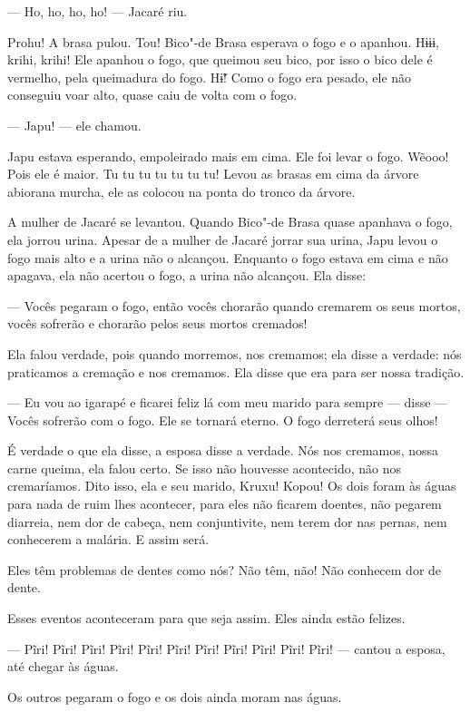 --- Ho, ho, ho, ho! --- Jacaré riu. 

Prohu! A brasa pulou. Tou! Bico"-de Brasa esperava o fogo e
o apanhou. Hɨɨɨ, krihi, krihi! Ele apanhou o fogo, que queimou seu
bico, por isso o bico dele é vermelho, pela queimadura do
fogo. Hɨ̃! Como o fogo era pesado, ele não conseguiu voar alto,
quase caiu de volta com o fogo. 

--- Japu! --- ele chamou.

Japu estava esperando, empoleirado mais em cima. Ele foi levar o fogo.
Wẽooo! Pois ele é maior. Tu tu tu tu tu tu tu! Levou as brasas em cima
da árvore abiorana murcha, ele as colocou na ponta do tronco da árvore. 

A mulher de Jacaré se levantou. Quando Bico"-de Brasa quase apanhava o
fogo, ela jorrou urina. Apesar de a mulher de Jacaré jorrar sua urina,
Japu levou o fogo mais alto e a urina não o alcançou. Enquanto
o fogo estava em cima e não apagava, ela não acertou o fogo, a urina não
alcançou. Ela disse:

--- Vocês pegaram o fogo, então vocês chorarão quando cremarem os seus
mortos, vocês sofrerão e chorarão pelos seus mortos cremados! 

Ela falou verdade, pois quando morremos, nos cremamos; ela disse a
verdade: nós praticamos a cremação e nos cremamos. Ela disse que era
para ser nossa tradição. 

--- Eu vou ao igarapé e ficarei feliz lá com meu marido para sempre ---
disse --- Vocês sofrerão com o fogo. Ele se tornará eterno. O fogo
derreterá seus olhos! 

É verdade o que ela disse, a esposa disse a verdade. Nós nos cremamos,
nossa carne queima, ela falou certo. Se isso não houvesse acontecido,
não nos cremaríamos. Dito isso, ela e seu marido, Kruxu! Kopou! Os dois
foram às águas para nada de ruim lhes acontecer, para eles não ficarem
doentes, não pegarem diarreia, nem dor de cabeça, nem conjuntivite, nem
terem dor nas pernas, nem conhecerem a malária. E assim será. 

Eles têm problemas de dentes como nós? Não têm, não! Não conhecem dor de
dente. 

Esses eventos aconteceram para que seja assim. Eles ainda estão
felizes. 

--- Pĩri! Pĩri! Pĩri! Pĩri! Pĩri! Pĩri! Pĩri! Pĩri! Pĩri! Pĩri! Pĩri!
--- cantou a esposa, até chegar às águas. 

Os outros pegaram o fogo e os dois ainda moram nas águas.
